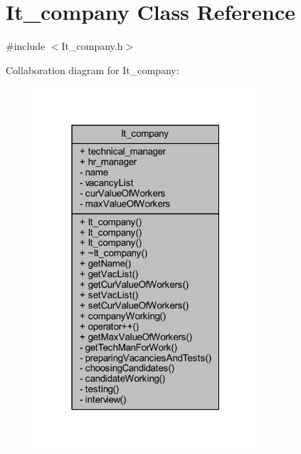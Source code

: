 \hypertarget{class_it__company}{}\section{It\+\_\+company Class Reference}
\label{class_it__company}


{\ttfamily \#include $<$It\+\_\+company.\+h$>$}



Collaboration diagram for It\+\_\+company\+:
\nopagebreak
\begin{figure}[H]
\begin{center}
\leavevmode
\includegraphics[width=235pt]{class_it__company__coll__graph}
\end{center}
\end{figure}
